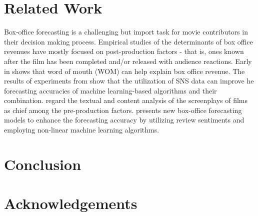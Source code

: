 \section{Related Work}
\label{sec:related}
Box-office forecasting is a challenging but import task for movie contributors in their decision making process. Empirical studies of the determinants of box office revenues have mostly focused on post-production factors - that is, ones known after the film has been completed and/or released with audience reactions. Early in \cite{liu2006word} shows that word of mouth (WOM) can help explain box office revenue. The results of experiments from \cite{kim2015box} show that the utilization of SNS data can improve he forecasting accuracies of machine learning-based algorithms and their combination. \cite{hunter2016predicting} regard the textual and content analysis of the screenplays of films as chief among the pre-production factors. \cite{hur2016box} presents new box-office forecasting models to enhance the forecasting accuracy by utilizing review sentiments and employing non-linear machine learning algorithms. 

\section{Conclusion}
\label{sec:conclu}

\section{Acknowledgements}